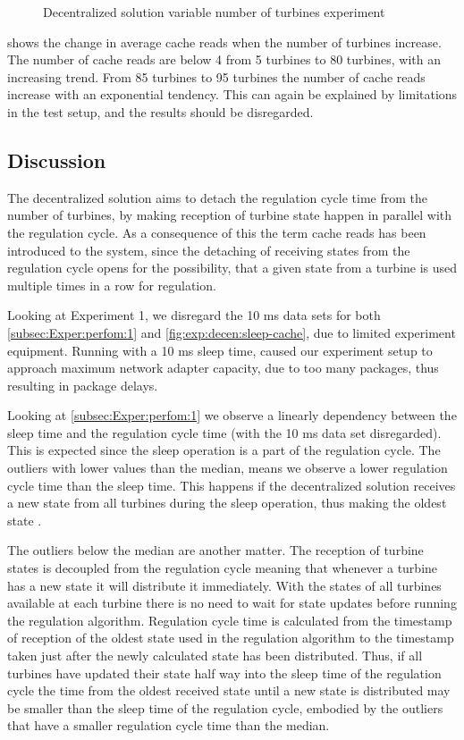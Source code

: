 \begin{figure}[h!]
	\centering
	
	\caption{Decentralized solution variable number of turbines experiment}
	\label{fig:exp:decen:turbines_cache}
\end{figure}


 shows the change in average cache reads when the number of turbines increase. The number of cache reads are below 4 from 5 turbines to 80 turbines, with an increasing trend. From 85 turbines to 95 turbines the number of cache reads increase with an exponential tendency. This can again be explained by limitations in the test setup, and the results should be disregarded.
        
        
\subsection{Discussion} 
The decentralized solution aims to detach the regulation cycle time from the number of turbines, by making reception of turbine state happen in parallel with the regulation cycle. As a consequence of this the term cache reads has been introduced to the system, since the detaching of receiving states from the regulation cycle opens for the possibility, that a given state from a turbine is used multiple times in a row for regulation. 

Looking at Experiment 1, we disregard the 10 ms data sets for both \cref{subsec:Exper:perfom:1} and \cref{fig:exp:decen:sleep-cache}, due to limited experiment equipment. Running with a 10 ms sleep time, caused our experiment setup to approach maximum network adapter capacity, due to too many packages, thus resulting in package delays.

Looking at \cref{subsec:Exper:perfom:1} we observe a linearly dependency between the sleep time and the regulation cycle time (with the 10 ms data set disregarded). This is expected since the sleep operation is a part of the regulation cycle. The outliers with lower values than the median, means we observe a lower regulation cycle time than the sleep time. This happens if the decentralized solution receives a new state from all turbines during the sleep operation, thus making the oldest state .



The outliers below the median are another matter. The reception of turbine states is decoupled from the regulation cycle meaning that whenever a turbine has a new state it will distribute it immediately. With the states of all turbines available at each turbine there is no need to wait for state updates before running the regulation algorithm. Regulation cycle time is calculated from the timestamp of reception of the oldest state used in the regulation algorithm to the timestamp taken just after the newly calculated state has been distributed. Thus, if all turbines have updated their state half way into the sleep time of the regulation cycle the time from the oldest received state until a new state is distributed may be smaller than the sleep time of the regulation cycle, embodied by the outliers that have a smaller regulation cycle time than the median.



